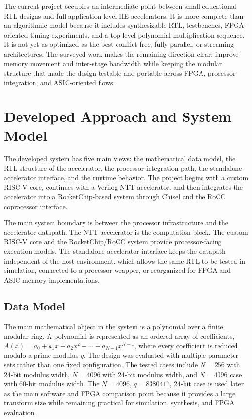 \documentclass[a4paper, 12pt, titlepage]{article}
\begin{document}
The current project occupies an intermediate point between small educational RTL
designs and full application-level HE accelerators. It is more complete than an
algorithmic model because it includes synthesizable RTL, testbenches,
FPGA-oriented timing experiments, and a top-level polynomial multiplication
sequence. It is not yet as optimized as the best conflict-free, fully parallel,
or streaming architectures. The surveyed work makes the remaining direction
clear: improve memory movement and inter-stage bandwidth while keeping the
modular structure that made the design testable and portable across FPGA,
processor-integration, and ASIC-oriented flows.
\newpage

\section{Developed Approach and System Model}
The developed system has five main views: the mathematical data model, the RTL
structure of the accelerator, the processor-integration path, the standalone
accelerator interface, and the runtime behavior. The project begins with a
custom RISC-V core, continues with a Verilog NTT accelerator, and then
integrates the accelerator into a RocketChip-based system through Chisel and
the RoCC coprocessor interface.

The main system boundary is between the processor infrastructure and the
accelerator datapath. The NTT accelerator is the computation block. The custom RISC-V core
and the RocketChip/RoCC system provide processor-facing execution models. The
standalone accelerator interface keeps the datapath independent of the host
environment, which allows the same RTL to be tested in simulation, connected to
a processor wrapper, or reorganized for FPGA and ASIC memory implementations.

\subsection{Data Model}

The main mathematical object in the system is a polynomial over a finite modular
ring. A polynomial is represented as an ordered array of coefficients,
\(A(x)=a_0+a_1x+a_2x^2+\cdots+a_{N-1}x^{N-1}\), where every coefficient is
reduced modulo a prime modulus $q$. The design was
evaluated with multiple parameter sets rather than one fixed configuration. The
tested cases include \(N=256\) with 24-bit modulus width, \(N=4096\) with
24-bit modulus width, and \(N=4096\) case with 60-bit modulus
width. The \(N=4096\), \(q=8380417\), 24-bit case is used later as the main
software and FPGA comparison point because it provides a large transform size
while remaining practical for simulation, synthesis, and FPGA evaluation.
\end{document}
